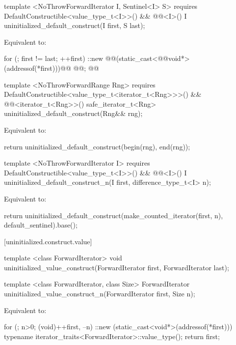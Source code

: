 {\color{addclr}
\begin{codeblock}
template <NoThrowForwardIterator I, Sentinel<I> S>
  requires DefaultConstructible<value_type_t<I>>() &&
           @@<I>()
    I uninitialized_default_construct(I first, S last);
\end{codeblock}
} %

\setcounter{Paras}{0}
\pnum
\effects Equivalent to:
\begin{codeblock}
        for (; first != last; ++first)
          ::new @@(static_cast<@@void*>(addressof(*first)))@\added{)}@
            @@;
        @@
\end{codeblock}

{\color{addclr}
\begin{codeblock}
  template <NoThrowForwardRange Rng>
    requires DefaultConstructible<value_type_t<iterator_t<Rng>>>() &&
             @@<iterator_t<Rng>>()
  safe_iterator_t<Rng>
  uninitialized_default_construct(Rng&& rng);
\end{codeblock}

\pnum
\effects Equivalent to:
\begin{codeblock}
        return uninitialized_default_construct(begin(rng), end(rng));
\end{codeblock}

\begin{codeblock}
template <NoThrowForwardIterator I>
  requires DefaultConstructible<value_type_t<I>>() &&
           @@<I>()
    I uninitialized_default_construct_n(I first, difference_type_t<I> n);
\end{codeblock}

\pnum
\effects Equivalent to:
\begin{codeblock}
        return uninitialized_default_construct(make_counted_iterator(first, n),
                                               default_sentinel{}).base();
\end{codeblock}
} %

[uninitialized.construct.value]{}
{\color{remclr}
\begin{codeblock}
template <class ForwardIterator>
  void uninitialized_value_construct(ForwardIterator first, ForwardIterator last);
\end{codeblock}

\begin{codeblock}
template <class ForwardIterator, class Size>
  ForwardIterator uninitialized_value_construct_n(ForwardIterator first, Size n);
\end{codeblock}
\setcounter{Paras}{1}
\pnum
\effects Equivalent to:
\begin{codeblock}
        for (; n>0; (void)++first, --n)
          ::new (static_cast<void*>(addressof(*first)))
            typename iterator_traits<ForwardIterator>::value_type();
        return first;
\end{codeblock}
} %

